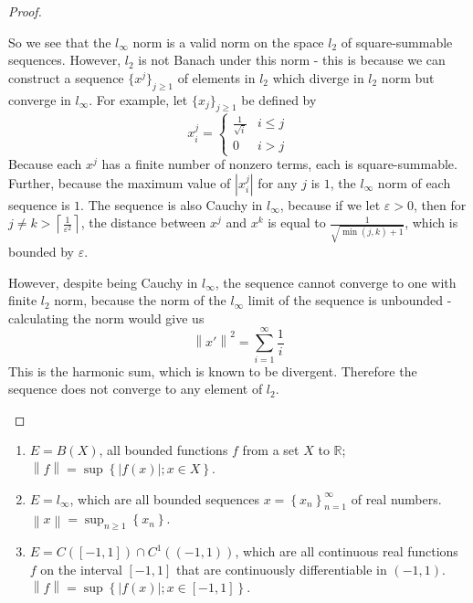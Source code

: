 \documentclass[12pt]{article}
\newcommand{\R}{\mathbb{R}}
\theoremstyle{definition}
\newenvironment{problem}[2][Problem]{\begin{trivlist}
\item[\hskip \labelsep {\bfseries #1}\hskip \labelsep {\bfseries #2.}]}{\end{trivlist}}
\begin{document}
\begin{proof}
\begin{enumerate}[label=(\roman*)]
\begin{itemize}
        \end{itemize}   
        So we see that the $l_\infty$ norm is a valid norm on the space $l_2$ of square-summable sequences. However, $l_2$ is not Banach under this norm - this is because we can construct a sequence $\{x^j\}_{j \geq 1}$ of elements in $l_2$ which diverge in $l_2$ norm but converge in $l_\infty$. For example, let $\{x_j\}_{j \geq 1}$ be defined by
        \[
        x^j_i = \begin{cases}
        \frac{1}{\sqrt{i}} & i \leq j\\
        0 & i > j
        \end{cases}
        \]
        Because each $x^j$ has a finite number of nonzero terms, each is square-summable. Further, because the maximum value of $\left \lvert x^j_i \right \rvert$ for any $j$ is $1$, the $l_\infty$ norm of each sequence is $1$. The sequence is also Cauchy in $l_\infty$, because if we let $\varepsilon > 0$, then for $j \neq k > \left \lceil \frac{1}{\varepsilon^2} \right \rceil$, the distance between $x^j$ and $x^k$ is equal to $\frac{1}{\sqrt{\min(j,k)+1}}$, which is bounded by  $\varepsilon$. 
        \par However, despite being Cauchy in $l_\infty$, the sequence cannot converge to one with finite $l_2$ norm, because the norm of the $l_\infty$ limit of the sequence is unbounded - calculating the norm would give us
        \[
		\left \lVert x' \right \rVert^2 = \sum_{i=1}^\infty \frac{1}{i}
        \]
	This is the harmonic sum, which is known to be divergent. Therefore the sequence does not converge to any element of $l_2$.
	\end{enumerate}
\end{proof}
\begin{problem}{2}
	\begin{enumerate}[label=(\roman*)]
		\item $E = B(X)$, all bounded functions $f$ from a set $X$ to $\R$;
			\\$\left \lVert { f } \right \lVert = \sup \left\{ \left \lvert { f(x) } \right \lvert ; x \in X \right\}$.
		\item $E = l_\infty$, which are all bounded sequences $x = \left\{ x_n \right\}_{n=1}^\infty$ of real numbers. $\left \lVert {  x  } \right \lVert  = \sup_{n\geq 1}\left\{ x_n \right\}$.
		\item $E = C(\left[ -1,1 \right]) \cap C^1\left( \left( -1,1 \right) \right)$, which are all continuous real functions $f$ on the interval $\left[ -1,1 \right]$ that are continuously differentiable in $\left( -1,1 \right)$. $\left \lVert {  f } \right \lVert  = \sup\left\{ \left \lvert { f(x) } \right \lvert ; x \in \left[ -1,1 \right] \right\}$.
	\end{enumerate}
\end{problem}
\end{document}
